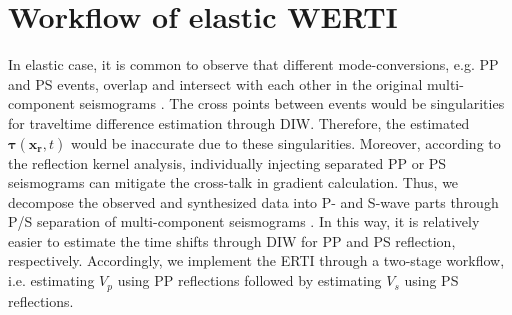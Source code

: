 \documentclass[extra,mreferee]{gji}
\newcommand{\bsy}[1]{\boldsymbol{{}#1}}
\begin{document}
\section{Workflow of elastic WERTI}
In elastic case, it is common to observe that different mode-conversions, e.g. PP
and PS events, overlap and intersect with each other in the original multi-component
seismograms . The cross points between events
would be singularities for traveltime difference estimation through DIW.
Therefore, the estimated $\bsy{\tau}(\mathbf{x_r},t)$ would be inaccurate due
to these singularities.
Moreover, according to the reflection kernel analysis, individually injecting separated
PP or PS seismograms
can mitigate the cross-talk in gradient calculation. 
Thus, we decompose the observed and synthesized data into P- and S-wave
parts through P/S separation of multi-component seismograms \cite[]{Li2016a}.
In this way, 
it is relatively easier to estimate the time shifts through DIW for PP and PS reflection,
respectively.
Accordingly, we implement the ERTI through a two-stage
workflow, i.e. estimating $V_p$ using PP reflections followed by estimating $V_s$ 
using PS reflections.
\end{document}

